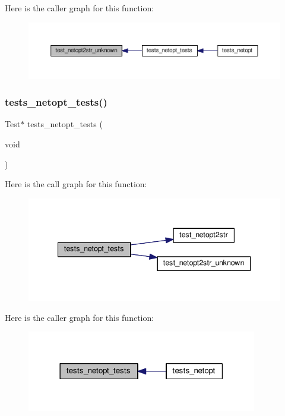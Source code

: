 Here is the caller graph for this function\+:
\nopagebreak
\begin{figure}[H]
\begin{center}
\leavevmode
\includegraphics[width=350pt]{tests-netopt_8c_a0231f9da54bcb6641ba245e21ba19855_icgraph}
\end{center}
\end{figure}
\mbox{\label{tests-netopt_8c_a5113077204e030cef7614ca96ae3ff14}} 
\subsubsection{\texorpdfstring{tests\+\_\+netopt\+\_\+tests()}{tests\_netopt\_tests()}}
{\footnotesize\ttfamily Test$\ast$ tests\+\_\+netopt\+\_\+tests (\begin{DoxyParamCaption}\item[{void}]{ }\end{DoxyParamCaption})}

Here is the call graph for this function\+:
\nopagebreak
\begin{figure}[H]
\begin{center}
\leavevmode
\includegraphics[width=340pt]{tests-netopt_8c_a5113077204e030cef7614ca96ae3ff14_cgraph}
\end{center}
\end{figure}
Here is the caller graph for this function\+:
\nopagebreak
\begin{figure}[H]
\begin{center}
\leavevmode
\includegraphics[width=285pt]{tests-netopt_8c_a5113077204e030cef7614ca96ae3ff14_icgraph}
\end{center}
\end{figure}
